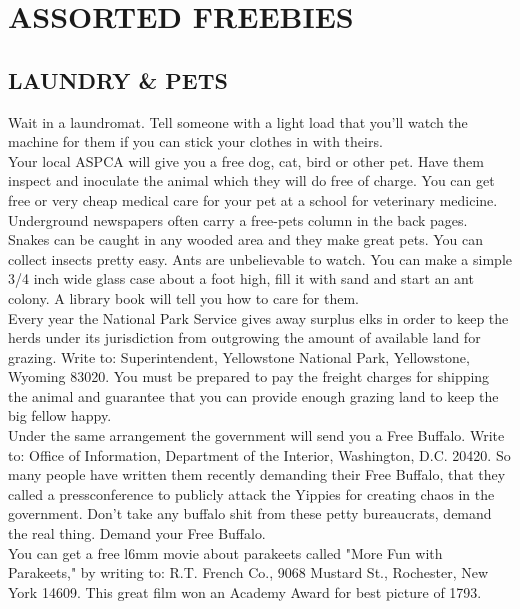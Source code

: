 \documentclass[11pt,twoside,a4paper]{book}
\begin{document}
\section{ASSORTED FREEBIES}

\subsection{LAUNDRY \& PETS}

Wait in a laundromat. Tell someone with a light load that you'll watch the machine for them if you can stick your clothes in with theirs.~\\

Your local ASPCA will give you a free dog, cat, bird or other pet. Have them inspect and inoculate the animal which they will do free of charge. You can get free or very cheap medical care for your pet at a school for veterinary medicine.~\\

Underground newspapers often carry a free-pets column in the back pages. Snakes can be caught in any wooded area and they make great pets. You can collect insects pretty easy. Ants are unbelievable to watch. You can make a simple 3/4 inch wide glass case about a foot high, fill it with sand and start an ant colony. A library book will tell you how to care for them.~\\

Every year the National Park Service gives away surplus elks in order to keep the herds under its jurisdiction from outgrowing the amount of available land for grazing. Write to: Superintendent, Yellowstone National Park, Yellowstone, Wyoming 83020. You must be prepared to pay the freight charges for shipping the animal and guarantee that you can provide enough grazing land to keep the big fellow happy.~\\

Under the same arrangement the government will send you a Free Buffalo. Write to: Office of Information, Department of the Interior, Washington, D.C. 20420. So many people have written them recently demanding their Free Buffalo, that they called a pressconference to publicly attack the Yippies for creating chaos in the government. Don't take any buffalo shit from these petty bureaucrats, demand the real thing. Demand your Free Buffalo.~\\

You can get a free l6mm movie about parakeets called "More Fun with Parakeets," by writing to: R.T. French Co., 9068 Mustard St., Rochester, New York 14609. This great film won an Academy Award for best picture of 1793.
\end{document}
